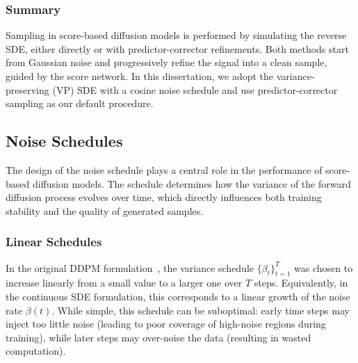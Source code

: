 \documentclass[a4paper,12pt]{article}
\begin{document}
\subsubsection{Summary}

Sampling in score-based diffusion models is performed by simulating the reverse SDE, either directly or with predictor-corrector refinements. Both methods start from Gaussian noise and progressively refine the signal into a clean sample, guided by the score network. In this dissertation, we adopt the variance-preserving (VP) SDE with a cosine noise schedule and use predictor-corrector sampling as our default procedure.

\subsection{Noise Schedules}
The design of the noise schedule plays a central role in the performance of score-based diffusion models. 
The schedule determines how the variance of the forward diffusion process evolves over time, which directly influences both training stability and the quality of generated samples.

\subsubsection*{Linear Schedules}

In the original DDPM formulation~\cite{hoDenoisingDiffusionProbabilistic2020}, the variance schedule $\{\beta_t\}_{t=1}^T$ was chosen to increase linearly from a small value to a larger one over $T$ steps. 
Equivalently, in the continuous SDE formulation, this corresponds to a linear growth of the noise rate $\beta(t)$. 
While simple, this schedule can be suboptimal: early time steps may inject too little noise (leading to poor coverage of high-noise regions during training), while later steps may over-noise the data (resulting in wasted computation). 
\end{document}
